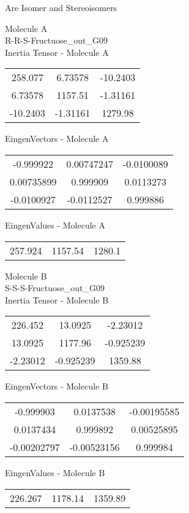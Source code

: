 \begin{center}
\vtab
\vtab
\textcolor{NavyBlue}{\Large Are Isomer and Stereoisomers}
\end{center}
\newpage
\begin{multicols}{2}
\begin{center}
Molecule A \\ 
R-R-S-Fructuose\_out\_G09
\\
Inertia Tensor - Molecule A \\
\vtab
\begin{tabular}{|c c c|}
258.077	 & 	6.73578	 & 	-10.2403	 \\
6.73578	 & 	1157.51	 & 	-1.31161	 \\
-10.2403	 & 	-1.31161	 & 	1279.98
\end{tabular}

\vtab
 EingenVectors - Molecule A     \\
\vtab
\begin{tabular}{|c c c|}
-0.999922	 & 	0.00747247	 & 	-0.0100089	 \\
0.00735899	 & 	0.999909	 & 	0.0113273	 \\
-0.0100927	 & 	-0.0112527	 & 	0.999886
\end{tabular}

\vtab
 EingenValues - Molecule A     \\
\vtab
\begin{tabular}{|c c c|}
257.924	 & 	1157.54	 & 	1280.1
\end{tabular}
\columnbreak

Molecule B \\ 
S-S-S-Fructuose\_out\_G09
\\
Inertia Tensor - Molecule B \\
\vtab
\begin{tabular}{|c c c|}
226.452	 & 	13.0925	 & 	-2.23012	 \\
13.0925	 & 	1177.96	 & 	-0.925239	 \\
-2.23012	 & 	-0.925239	 & 	1359.88
\end{tabular}

\vtab
 EingenVectors - Molecule B     \\
\vtab
\begin{tabular}{|c c c|}
-0.999903	 & 	0.0137538	 & 	-0.00195585	 \\
0.0137434	 & 	0.999892	 & 	0.00525895	 \\
-0.00202797	 & 	-0.00523156	 & 	0.999984
\end{tabular}

\vtab
 EingenValues - Molecule B     \\
\vtab
\begin{tabular}{|c c c|}
226.267	 & 	1178.14	 & 	1359.89
\end{tabular}

\end{center}
\end{multicols}
